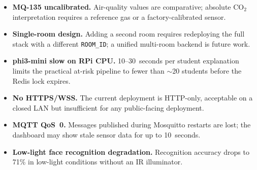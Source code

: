 \begin{itemize}
  \item \textbf{MQ-135 uncalibrated.}  Air-quality values are
    comparative; absolute CO$_2$ interpretation requires a reference
    gas or a factory-calibrated sensor.

  \item \textbf{Single-room design.}  Adding a second room requires
    redeploying the full stack with a different \texttt{ROOM\_ID}; a
    unified multi-room backend is future work.

  \item \textbf{phi3-mini slow on RPi CPU.}  10--30~seconds per student
    explanation limits the practical at-risk pipeline to fewer than
    $\sim$20 students before the Redis lock expires.

  \item \textbf{No HTTPS/WSS.}  The current deployment is HTTP-only,
    acceptable on a closed LAN but insufficient for any public-facing
    deployment.

  \item \textbf{MQTT QoS~0.}  Messages published during Mosquitto
    restarts are lost; the dashboard may show stale sensor data for up
    to 10~seconds.

  \item \textbf{Low-light face recognition degradation.}  Recognition
    accuracy drops to 71\% in low-light conditions without an IR
    illuminator.
\end{itemize}
